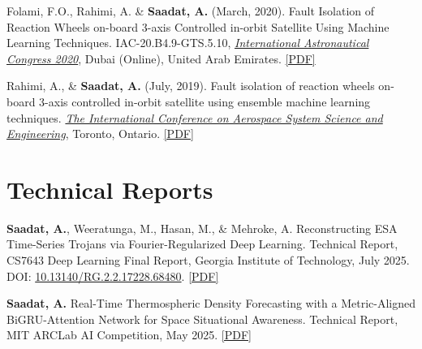 \documentclass[letterpaper,11pt]{article}
\newcommand{\shiftleft}[2]{\makebox[0pt][r]{\makebox[#1][l]{#2}}}
\newcommand{\cvIcon}[1]{\BeginAccSupp{ActualText={}}#1\EndAccSupp{}}
\def\shiftleft#1#2{}%
\def\faEdit{}%
\begin{document}
\begin{itemize}[leftmargin=0.15in, label={}]
{    \item{Folami, F.O., Rahimi, A. \& \textbf{Saadat, A.} (March, 2020). Fault Isolation of Reaction Wheels on-board 3-axis Controlled in-orbit Satellite Using Machine Learning Techniques. IAC-20.B4.9-GTS.5.10, \emph{\href{https://www.iafastro.org/events/iac/iac-2020/}{International Astronautical Congress 2020}}, Dubai (Online), United Arab Emirates. \href{https://www.researchgate.net/publication/344676787_Fault_Isolation_of_Reaction_Wheels_onboard_3-axis_Controlled_in-orbit_Satellite_Using_Machine_Learning_Techniques}{[PDF]}}
    
    \item{Rahimi, A., \& \textbf{Saadat, A.} (July, 2019). Fault isolation of reaction wheels on-board 3-axis controlled in-orbit satellite using ensemble machine learning techniques. \emph{\href{https://www.utias.utoronto.ca/icasse/}{The International Conference on Aerospace System Science and Engineering}}, Toronto, Ontario. \href{https://www.researchgate.net/publication/336106932_Fault_Isolation_of_Reaction_Wheels_Onboard_3-axis_Controlled_In-orbit_Satellites_Using_Ensemble_Machine_Learning_Techniques}{[PDF]}}
    
    }
 \end{itemize}

\section[Technical Reports]{\shiftleft{18pt}{\cvIcon{\faEdit}}Technical Reports}
 \begin{itemize}[leftmargin=0.15in, label={}]
    \small{

    \item{\textbf{Saadat, A.}, Weeratunga, M., Hasan, M., \& Mehroke, A.  
    Reconstructing ESA Time-Series Trojans via Fourier-Regularized Deep Learning.  
    Technical Report, CS7643 Deep Learning Final Report, Georgia Institute of Technology, July 2025.  
    DOI: \href{http://dx.doi.org/10.13140/RG.2.2.17228.68480}{10.13140/RG.2.2.17228.68480}.  
    \href{https://www.researchgate.net/publication/395025516}{[PDF]}}

    \item{\textbf{Saadat, A.}  
    Real-Time Thermospheric Density Forecasting with a Metric-Aligned BiGRU-Attention Network for Space Situational Awareness.  
    Technical Report, MIT ARCLab AI Competition, May 2025.  
    \href{https://www.researchgate.net/publication/393786213}{[PDF]}}

    }
 \end{itemize}
\end{document}
